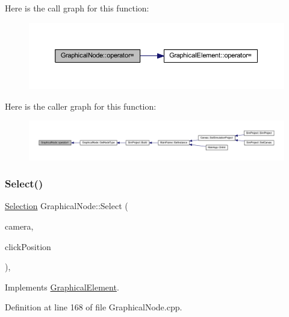 Here is the call graph for this function\+:
\nopagebreak
\begin{figure}[H]
\begin{center}
\leavevmode
\includegraphics[width=350pt]{class_graphical_node_a9c5dc1b7f344e2785531318167c2826b_cgraph}
\end{center}
\end{figure}
Here is the caller graph for this function\+:
\nopagebreak
\begin{figure}[H]
\begin{center}
\leavevmode
\includegraphics[width=350pt]{class_graphical_node_a9c5dc1b7f344e2785531318167c2826b_icgraph}
\end{center}
\end{figure}
\mbox{\label{class_graphical_node_ac73e20f3d4c5cca556e0140ef558f6a4}} 
\subsubsection{\texorpdfstring{Select()}{Select()}}
{\footnotesize\ttfamily \hyperlink{struct_selection}{Selection} Graphical\+Node\+::\+Select (\begin{DoxyParamCaption}\item[{const wx\+Affine\+Matrix2D \&}]{camera,  }\item[{wx\+Point2\+D\+Double}]{click\+Position }\end{DoxyParamCaption})\hspace{0.3cm}{\ttfamily [override]}, {\ttfamily [virtual]}}



Implements \hyperlink{class_graphical_element_a2627b34e57829f942aa00720d9cc8b46}{Graphical\+Element}.



Definition at line 168 of file Graphical\+Node.\+cpp.

